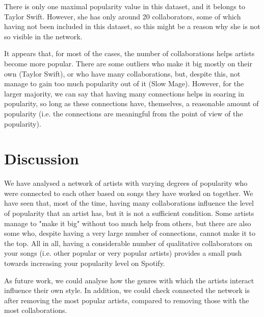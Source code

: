 \documentclass[sigchi]{acmart}
\begin{document}
There is only one maximal popularity value in this dataset, and it belongs to Taylor Swift. However, she has only around 20 collaborators, some of which having not been included in this dataset, so this might be a reason why she is not so visible in the network.

It appears that, for most of the cases, the number of collaborations helps artists become more popular. There are some outliers who make it big mostly on their own (Taylor Swift), or who have many collaborations, but, despite this, not manage to gain too much popularity out of it (Slow Mage). However, for the larger majority, we can say that having many connections helps in soaring in popularity, so long as these connections have, themselves, a reasonable amount of popularity (i.e. the connections are meaningful from the point of view of the popularity).



\section{Discussion}
We have analysed a network of artists with varying degrees of popularity who were connected to each other based on songs they have worked on together. We have seen that, most of the time, having many collaborations influence the level of popularity that an artist has, but it is not a sufficient condition. Some artists manage to "make it big" without too much help from others, but there are also some who, despite having a very large number of connections, cannot make it to the top. All in all, having a considerable number of qualitative collaborators on your songs (i.e. other popular or very popular artists) provides a small push towards increasing your popularity level on Spotify.

As future work, we could analyse how the genres with which the artists interact influence their own style. In addition, we could check connected the network is after removing the most popular artists, compared to removing those with the most collaborations.



\end{document}
